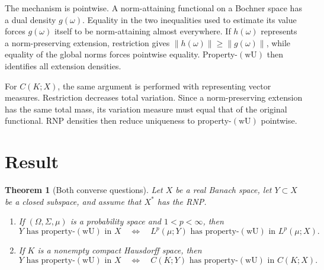 \documentclass[11pt]{article}
\newtheorem{theorem}{Theorem}
\newcommand{\wU}{\mathrm{(wU)}}
\begin{document}
The mechanism is pointwise. A norm-attaining functional on a Bochner space has
a dual density $g(\omega)$. Equality in the two inequalities used to estimate
its value forces $g(\omega)$ itself to be norm-attaining almost everywhere.
If $h(\omega)$ represents a norm-preserving extension, restriction gives
$\|h(\omega)\|\geq\|g(\omega)\|$, while equality of the global norms forces
pointwise equality. Property-$\wU$ then identifies all extension densities.

For $C(K;X)$, the same argument is performed with representing vector measures.
Restriction decreases total variation. Since a norm-preserving extension has
the same total mass, its variation measure must equal that of the original
functional. RNP densities then reduce uniqueness to property-$\wU$ pointwise.

\section*{Result}

\begin{theorem}[Both converse questions]
Let $X$ be a real Banach space, let $Y\subset X$ be a closed subspace, and
assume that $X^*$ has the RNP.
\begin{enumerate}[label=\textup{(\roman*)}]
\item If $(\Omega,\Sigma,\mu)$ is a probability space and $1<p<\infty$, then
\[
Y\text{ has property-}\wU\text{ in }X
\quad\Longleftrightarrow\quad
L^p(\mu;Y)\text{ has property-}\wU\text{ in }L^p(\mu;X).
\]
\item If $K$ is a nonempty compact Hausdorff space, then
\[
Y\text{ has property-}\wU\text{ in }X
\quad\Longleftrightarrow\quad
C(K;Y)\text{ has property-}\wU\text{ in }C(K;X).
\]
\end{enumerate}
\end{theorem}
\end{document}
